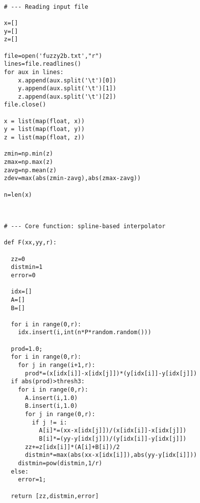 \documentclass[oneside,10pt]{book}
\begin{document}
\quad \\

\begin{lstlisting}
# --- Reading input file 

x=[]
y=[]
z=[]

file=open('fuzzy2b.txt',"r")
lines=file.readlines()
for aux in lines:
    x.append(aux.split('\t')[0])
    y.append(aux.split('\t')[1])
    z.append(aux.split('\t')[2])
file.close()

x = list(map(float, x))
y = list(map(float, y))
z = list(map(float, z))

zmin=np.min(z)
zmax=np.max(z)
zavg=np.mean(z)
zdev=max(abs(zmin-zavg),abs(zmax-zavg))

n=len(x)

\end{lstlisting}

\quad \\

\begin{lstlisting}
# --- Core function: spline-based interpolator

def F(xx,yy,r):

  zz=0 
  distmin=1
  error=0

  idx=[]
  A=[]
  B=[]

  for i in range(0,r):
    idx.insert(i,int(n*P*random.random()))

  prod=1.0;
  for i in range(0,r): 
    for j in range(i+1,r): 
      prod*=(x[idx[i]]-x[idx[j]])*(y[idx[i]]-y[idx[j]])
  if abs(prod)>thresh3:
    for i in range(0,r): 
      A.insert(i,1.0)
      B.insert(i,1.0)
      for j in range(0,r): 
        if j != i:
          A[i]*=(xx-x[idx[j]])/(x[idx[i]]-x[idx[j]])
          B[i]*=(yy-y[idx[j]])/(y[idx[i]]-y[idx[j]])
      zz+=z[idx[i]]*(A[i]+B[i])/2
      distmin*=max(abs(xx-x[idx[i]]),abs(yy-y[idx[i]]))
    distmin=pow(distmin,1/r)
  else:
    error=1; 
 
  return [zz,distmin,error]
\end{lstlisting}

\quad \\
\end{document}
